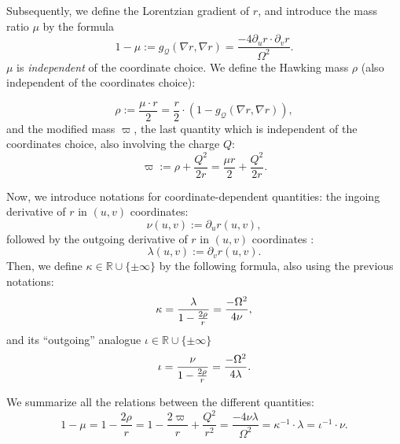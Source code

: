 \documentclass[10pt,a4paper]{article}
\theoremstyle{plain}
\theoremstyle{remark}
\theoremstyle{definition}
\newcommand{\RR}{\mathbb{R}}
\theoremstyle{plain}
\theoremstyle{remark}
\theoremstyle{definition}
\numberwithin{equation}{section}
\begin{document}
Subsequently, we define the Lorentzian gradient of $r$, and introduce the mass ratio $\mu$ by the formula $$ 1-\mu:=g_{\mathcal{Q}}(\nabla r,\nabla r)= \frac{-4 \partial_u r \cdot \partial_v r}{\Omega^2}.$$ $\mu$ is \textit{independent} of the coordinate choice. We define the Hawking	%
mass $\rho$ (also independent of the coordinates choice): 

$$ \rho := \frac{\mu \cdot r}{2} =\frac{r}{2} \cdot(1- g_{\mathcal{Q}} (\nabla r, \nabla r )),$$ and the modified mass $\varpi$, the last quantity which is independent of the coordinates choice, also involving the charge $Q$:
\begin{equation} \label{electromass}
\varpi := \rho + \frac{Q^2}{2r}= \frac{\mu r}{2} + \frac{Q^2}{2r} .
\end{equation}	

Now, we introduce notations for coordinate-dependent quantities: the ingoing derivative of $r$ in $(u,v)$ coordinates: \begin{equation} \label{nudef}
\nu(u,v):= \partial_u r (u,v),
\end{equation} followed by the outgoing derivative of $r$ in $(u,v)$ coordinates : \begin{equation} \label{lambdadef}
\lambda(u,v):= \partial_v r (u,v).
\end{equation}
Then, we define $\kappa \in \mathbb{R} \cup \{ \pm \infty\} $ by the following formula, also using the previous notations:
\begin{equation} \label{kappadef}
\kappa = \frac{\lambda}{1-\frac{2\rho}{r}}\color{black}=\frac{-\Omega^2}{4 \nu },
\end{equation} and its ``outgoing'' analogue  $\iota \in \mathbb{R} \cup \{ \pm \infty\} $ \begin{equation} \label{iotadef}
\iota = \frac{\nu}{1-\frac{2\rho}{r}}\color{black}=\frac{-\Omega^2}{4 \lambda }.
\end{equation}


We summarize all the relations between the different quantities:	\begin{equation} \label{murelation}
1-\mu =1-\frac{2\rho}{r} = 1-\frac{2\varpi}{r}+\frac{Q^2}{r^2}=\frac{-4 \nu \lambda}{\Omega^2}= \kappa^{-1} \cdot \lambda = \iota^{-1} \cdot \nu.
\end{equation}

\end{document}
